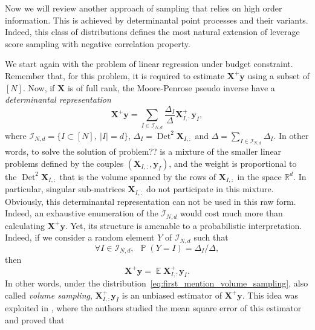 \documentclass[twoside,11pt]{book}
\numberwithin{theorem}{chapter}
\numberwithin{definition}{chapter}
\numberwithin{proposition}{chapter}
\numberwithin{corollary}{chapter}
\numberwithin{example}{chapter}
\numberwithin{lemma}{chapter}
\numberwithin{assumption}{chapter}
\numberwithin{equation}{chapter}
\numberwithin{figure}{chapter}
\DeclareMathOperator{\Det}{Det}
\DeclareMathOperator{\EX}{\mathbb{E}}
\DeclareMathOperator{\Prb}{\mathbb{P}}
\begin{document}
Now we will review another approach of sampling that relies on high order information. This is achieved by determinantal point processes and their variants. Indeed, this class of distributions defines the most natural extension of leverage score sampling with negative correlation property.

We start again with the problem of linear regression under budget constraint. Remember that, for this problem, it is required to estimate $\bm{X}^{+}\bm{y}$ using a subset of $[N]$. Now, if $\bm{X}$ is of full rank, the Moore-Penrose pseudo inverse have a \emph{determinantal representation} \citep{BeTe90}
\begin{equation}
\bm{X}^{+}\bm{y} = \sum\limits_{I \in \mathcal{I}_{N,d}} \frac{\Delta_{I}}{\Delta} \bm{X}_{I,:}^{+}\bm{y}_{I},
\end{equation}
where $\mathcal{I}_{N,d} = \{ I \subset [N], \:|I| = d \}$, $\Delta_{I} = \Det^{2} \bm{X}_{I,:}$ and $\Delta = \sum_{I \in \mathcal{I}_{N,d}} \Delta_{I}$. In other words, to solve the solution of problem?? is a mixture of the smaller linear problems defined by the couples $(\bm{X}_{I,:},\bm{y}_{I})$, and the weight is proportional to the $\Det^{2} \bm{X}_{I,:}$ that is the volume spanned by the rows of $\bm{X}_{I,:}$ in the space $\mathbb{R}^{d}$. In particular, singular sub-matrices $\bm{X}_{I,:}$ do not participate in this mixture. Obviously, this determinantal representation can not be used in this raw form. Indeed, an exhaustive enumeration of the $\mathcal{I}_{N,d}$ would cost much more than calculating $\bm{X}^{+}\bm{y}$. Yet, its structure is amenable to a probabilistic interpretation. Indeed, if we consider a random element $Y$ of $\mathcal{I}_{N,d}$ such that
\begin{equation}\label{eq:first_mention_volume_sampling}
\forall I \in \mathcal{I}_{N,d}, \:\: \Prb(Y = I) = \Delta_{I}/\Delta,
\end{equation} 
then
\begin{equation}\label{eq:first_mention_unbiasedness}
\bm{X}^{+}\bm{y} = \EX \bm{X}_{I,:}^{+}\bm{y}_{I}.
\end{equation}
In other words, under the distribution~\eqref{eq:first_mention_volume_sampling}, also called \emph{volume sampling}, $\bm{X}_{I,:}^{+}\bm{y}_{I}$ is an unbiased estimator of $\bm{X}^{+}\bm{y}$. 
This idea was exploited in \citep{DeWa17}, where the authors studied the mean square error of this estimator and proved that
\end{document}
